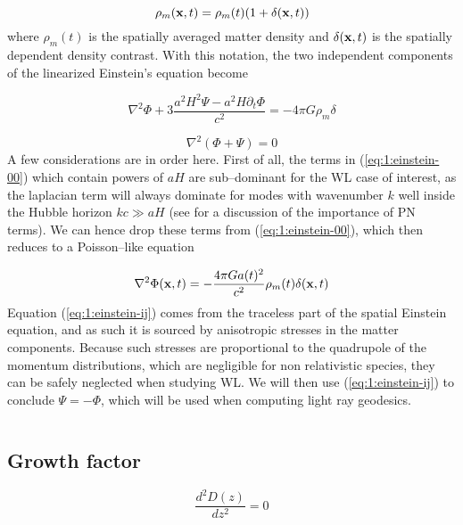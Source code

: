 \begin{equation}
\label{eq:1:matterrho}
\rho_m(\mathbf{x},t) = \rho_m(t)(1+\delta(\mathbf{x},t))
\end{equation}
%
where $\rho_m(t)$ is the spatially averaged matter density and $\delta(\mathbf{x},t)$ is the spatially dependent density contrast. With this notation, the two independent components of the linearized Einstein's equation become

\begin{equation}
\label{eq:1:einstein-00}
\nabla^2\Phi +3\frac{a^2H^2\Psi-a^2H\partial_t\Phi}{c^2} = -4\pi G\rho_m\delta
\end{equation}

\begin{equation}
\label{eq:1:einstein-ij}
\nabla^2(\Phi+\Psi) = 0
\end{equation}
%
A few considerations are in order here. First of all, the terms in (\ref{eq:1:einstein-00}) which contain powers of $aH$ are sub--dominant for the WL case of interest, as the laplacian term will always dominate for modes with wavenumber $k$ well inside the Hubble horizon $kc\gg aH$ (see \citep{PNLensing} for a discussion of the importance of PN terms). We can hence drop these terms from (\ref{eq:1:einstein-00}), which then reduces to a Poisson--like equation 

\begin{equation}
\label{eq:1:poisson}
\nabla^2\Phi(\mathbf{x},t) = -\frac{4\pi Ga(t)^2}{c^2}\rho_m(t)\delta(\mathbf{x},t)
\end{equation}
%
Equation (\ref{eq:1:einstein-ij}) comes from the traceless part of the spatial Einstein equation, and as such it is sourced by anisotropic stresses in the matter components. Because such stresses are proportional to the quadrupole of the momentum distributions, which are negligible for non relativistic species, they can be safely neglected when studying WL. We will then use (\ref{eq:1:einstein-ij}) to conclude $\Psi=-\Phi$, which will be used when computing light ray geodesics. 

\begin{equation}
\label{eq:1:delta-lin}
\end{equation} 

\subsection{Growth factor}

\begin{equation}
\label{eq:1:growth-diff}
\frac{d^2D(z)}{dz^2} = 0
\end{equation}

%